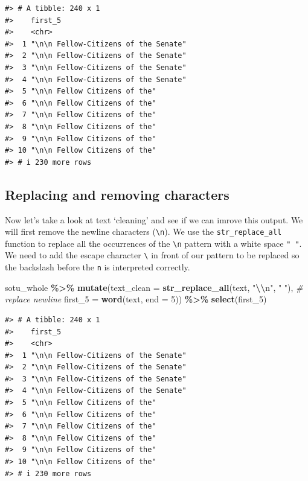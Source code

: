 \documentclass[
]{book}
\newenvironment{Shaded}{\begin{snugshade}}{\end{snugshade}}
\newcommand{\AttributeTok}[1]{\textcolor[rgb]{0.13,0.29,0.53}{#1}}
\newcommand{\CommentTok}[1]{\textcolor[rgb]{0.56,0.35,0.01}{\textit{#1}}}
\newcommand{\DecValTok}[1]{\textcolor[rgb]{0.00,0.00,0.81}{#1}}
\newcommand{\FunctionTok}[1]{\textcolor[rgb]{0.13,0.29,0.53}{\textbf{#1}}}
\newcommand{\NormalTok}[1]{#1}
\newcommand{\SpecialCharTok}[1]{\textcolor[rgb]{0.81,0.36,0.00}{\textbf{#1}}}
\newcommand{\StringTok}[1]{\textcolor[rgb]{0.31,0.60,0.02}{#1}}
\begin{document}
\begin{verbatim}
#> # A tibble: 240 x 1
#>    first_5                             
#>    <chr>                               
#>  1 "\n\n Fellow-Citizens of the Senate"
#>  2 "\n\n Fellow-Citizens of the Senate"
#>  3 "\n\n Fellow-Citizens of the Senate"
#>  4 "\n\n Fellow-Citizens of the Senate"
#>  5 "\n\n Fellow Citizens of the"       
#>  6 "\n\n Fellow Citizens of the"       
#>  7 "\n\n Fellow Citizens of the"       
#>  8 "\n\n Fellow Citizens of the"       
#>  9 "\n\n Fellow Citizens of the"       
#> 10 "\n\n Fellow Citizens of the"       
#> # i 230 more rows
\end{verbatim}

\subsection{Replacing and removing characters}\label{replacing-and-removing-characters}

Now let's take a look at text `cleaning' and see if we can imrove this output. We will first remove the newline characters (\texttt{\textbackslash{}n}). We use the \texttt{str\_replace\_all} function to replace all the occurrences of the \texttt{\textbackslash{}n} pattern with a white space \texttt{"\ "}. We need to add the escape character \texttt{\textbackslash{}} in front of our pattern to be replaced so the backslash before the \texttt{n} is interpreted correctly.

\begin{Shaded}
\begin{Highlighting}[]
\NormalTok{sotu\_whole }\SpecialCharTok{\%\textgreater{}\%} 
  \FunctionTok{mutate}\NormalTok{(}\AttributeTok{text\_clean =} \FunctionTok{str\_replace\_all}\NormalTok{(text, }\StringTok{"}\SpecialCharTok{\textbackslash{}\textbackslash{}}\StringTok{n"}\NormalTok{, }\StringTok{" "}\NormalTok{), }\CommentTok{\# replace newline}
         \AttributeTok{first\_5 =} \FunctionTok{word}\NormalTok{(text, }\AttributeTok{end =} \DecValTok{5}\NormalTok{)) }\SpecialCharTok{\%\textgreater{}\%} 
  \FunctionTok{select}\NormalTok{(first\_5)}
\end{Highlighting}
\end{Shaded}

\begin{verbatim}
#> # A tibble: 240 x 1
#>    first_5                             
#>    <chr>                               
#>  1 "\n\n Fellow-Citizens of the Senate"
#>  2 "\n\n Fellow-Citizens of the Senate"
#>  3 "\n\n Fellow-Citizens of the Senate"
#>  4 "\n\n Fellow-Citizens of the Senate"
#>  5 "\n\n Fellow Citizens of the"       
#>  6 "\n\n Fellow Citizens of the"       
#>  7 "\n\n Fellow Citizens of the"       
#>  8 "\n\n Fellow Citizens of the"       
#>  9 "\n\n Fellow Citizens of the"       
#> 10 "\n\n Fellow Citizens of the"       
#> # i 230 more rows
\end{verbatim}
\end{document}
